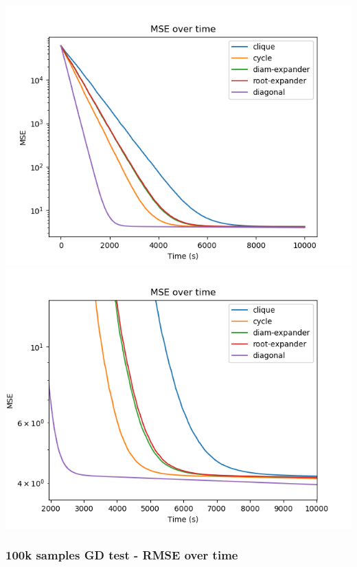 \documentclass[11pt]{article}
\makeatletter
\def\maxwidth{\ifdim\Gin@nat@width>\linewidth\linewidth
    \else\Gin@nat@width\fi}
\let\Oldincludegraphics\includegraphics
\renewcommand{\includegraphics}[1]{\Oldincludegraphics[width=.8\maxwidth]{#1}}
\makeatother
\begin{document}
\includegraphics{media/img/tests/test_003_100ksamples_classic/3_mse_time.png}
\includegraphics{media/img/tests/test_003_100ksamples_classic/3_mse_time_zoom.png}

    \subsubsection{100k samples GD test - RMSE over
time}\label{k-samples-gd-test---rmse-over-time}
\end{document}

